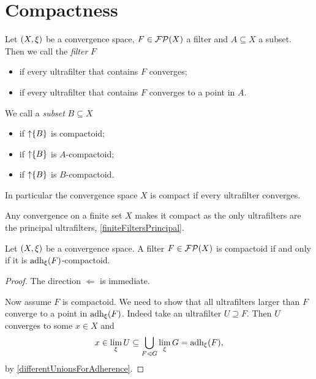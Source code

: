 \section{Compactness}
\begin{definition}
Let $\left( X,\xi \right)$ be a convergence space, $F\in\operatorname{\mathcal{FP}}(X)$ a filter and $A\subseteq X$ a subset. Then we call the \emph{filter} $F$
\begin{itemize}
\item {} if every ultrafilter that contains $F$ converges;
\item {} if every ultrafilter that contains $F$ converges to a point in $A$.
\end{itemize}
We call a \emph{subset} $B\subseteq X$
\begin{itemize}
\item {} if $\operatorname{\uparrow}\{B\}$ is compactoid;
\item {} if $\operatorname{\uparrow}\{B\}$ is $A$-compactoid;
\item {} if $\operatorname{\uparrow}\{B\}$ is $B$-compactoid.
\end{itemize}
\end{definition}
In particular the convergence space $X$ is compact if every ultrafilter converges.

\begin{example}
Any convergence on a finite set $X$ makes it compact as the only ultrafilters are the principal ultrafilters, \ref{finiteFiltersPrincipal}.
\end{example}

\begin{lemma} \label{allCompactoidLimitsInAdherence}
Let $\left( X,\xi \right)$ be a convergence space. A filter $F\in\operatorname{\mathcal{FP}}(X)$ is compactoid \textup{if and only if} it is $\operatorname{adh}_\xi(F)$-compactoid.
\end{lemma}
\begin{proof}
The direction $\Leftarrow$ is immediate.

Now assume $F$ is compactoid. We need to show that all ultrafilters larger than $F$ converge to a point in $\operatorname{adh}_\xi(F)$. Indeed take an ultrafilter $U\supseteq F$. Then $U$ converges to some $x\in X$ and
\[ x\in \lim_\xi U \subseteq \bigcup_{F\lhd G}\lim_\xi G = \operatorname{adh}_\xi(F), \]
by \ref{differentUnionsForAdherence}.
\end{proof}

